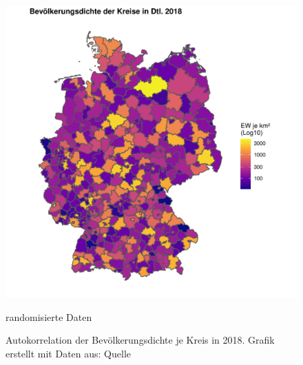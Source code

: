 \begin{figure}
\begin{minipage}[b]{.45\linewidth}
       \includegraphics[width=\linewidth,trim={2cm 1cm 1cm 1cm},clip]{body/figures/popdens2018-rdm.pdf}
       \caption{randomisierte Daten}
    \end{minipage}
    \caption[Bevölkerungsdichten ]{Autokorrelation der Bevölkerungsdichte je Kreis in 2018. Grafik erstellt mit Daten aus: Quelle}
    \label{fig_densitymaps}
 \end{figure}

